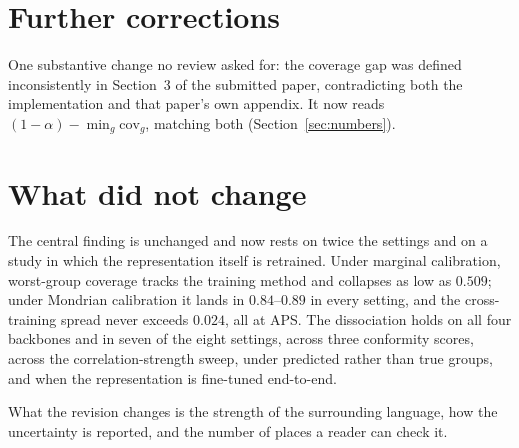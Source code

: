 \documentclass[11pt,a4paper]{article}
\begin{document}
\section{Further corrections}

One substantive change no review asked for: the coverage gap was defined inconsistently in
Section~3 of the submitted paper, contradicting both the implementation and that paper's own
appendix. It now reads $(1-\alpha)-\min_g\mathrm{cov}_g$, matching both (Section~\ref{sec:numbers}).

\section{What did not change}

The central finding is unchanged and now rests on twice the settings and on a study in which the
representation itself is retrained. Under marginal calibration, worst-group coverage tracks the
training method and collapses as low as $0.509$; under Mondrian calibration it lands in
$0.84$--$0.89$ in every setting, and the cross-training spread never exceeds $0.024$, all at APS. The
dissociation holds on all four backbones and in seven of the eight settings, across three
conformity scores, across the
correlation-strength sweep, under predicted rather than true groups, and when the representation is
fine-tuned end-to-end.

What the revision changes is the strength of the surrounding language, how the uncertainty is
reported, and the number of places a reader can check it.
\end{document}
